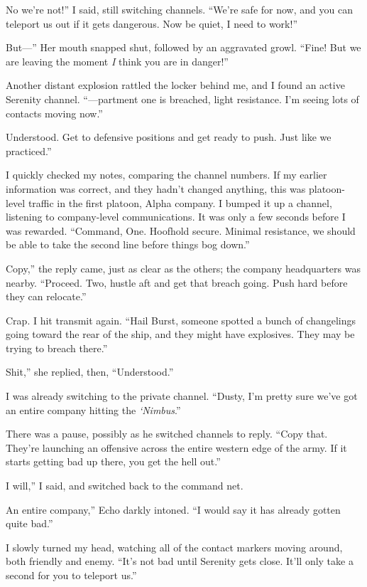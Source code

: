 \leavevmode{}No we’re not!” I said, still switching channels. “We’re safe for now, and you can teleport us out if it gets dangerous. Now be quiet, I need to work!”

\leavevmode{}But—” Her mouth snapped shut, followed by an aggravated growl. “Fine! But we are leaving the moment \textit{I} think you are in danger!”

Another distant explosion rattled the locker behind me, and I found an active Serenity channel. “—partment one is breached, light resistance. I’m seeing lots of contacts moving now.”

\leavevmode{}Understood. Get to defensive positions and get ready to push. Just like we practiced.”

I quickly checked my notes, comparing the channel numbers. If my earlier information was correct, and they hadn’t changed anything, this was platoon-level traffic in the first platoon, Alpha company. I bumped it up a channel, listening to company-level communications. It was only a few seconds before I was rewarded. “Command, One. Hoofhold secure. Minimal resistance, we should be able to take the second line before things bog down.”

\leavevmode{}Copy,” the reply came, just as clear as the others; the company headquarters was nearby. “Proceed. Two, hustle aft and get that breach going. Push hard before they can relocate.”

Crap. I hit transmit again. “Hail Burst, someone spotted a bunch of changelings going toward the rear of the ship, and they might have explosives. They may be trying to breach there.”

\leavevmode{}Shit,” she replied, then, “Understood.”

I was already switching to the private channel. “Dusty, I’m pretty sure we’ve got an entire company hitting the \textit{‘Nimbus}.”

There was a pause, possibly as he switched channels to reply. “Copy that. They’re launching an offensive across the entire western edge of the army. If it starts getting bad up there, you get the hell out.”

\leavevmode{}I will,” I said, and switched back to the command net.

\leavevmode{}An entire company,” Echo darkly intoned. “I would say it has already gotten quite bad.”

I slowly turned my head, watching all of the contact markers moving around, both friendly and enemy. “It’s not bad until Serenity gets close. It’ll only take a second for you to teleport us.”

